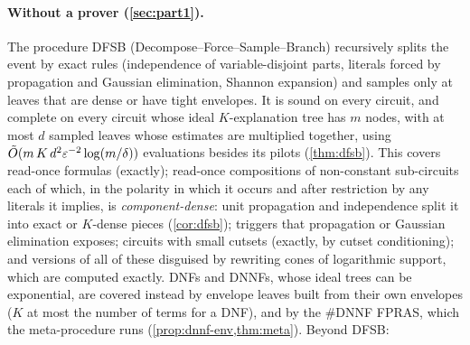\paragraph{Without a prover (\cref{sec:part1}).} The procedure DFSB
(Decompose--Force--Sample--Branch) recursively splits the event by exact rules
(independence of variable-disjoint parts, literals forced by propagation and Gaussian
elimination, Shannon expansion) and samples only at leaves that are dense or have tight
envelopes. It is sound on every circuit, and complete on every circuit whose ideal
$K$-explanation tree has $m$ nodes, with at most $d$ sampled leaves whose estimates are
multiplied together, using $\tilde O(m\,K\,d^2\varepsilon^{-2}\log(m/\delta))$ evaluations
besides its pilots (\cref{thm:dfsb}). This covers
read-once formulas (exactly); read-once compositions of non-constant sub-circuits each of
which, in the polarity in which it occurs and after restriction by any literals it implies,
is \emph{component-dense}: unit propagation and independence split it into exact or
$K$-dense pieces (\cref{cor:dfsb}); triggers that propagation or Gaussian elimination
exposes;
circuits with small cutsets (exactly, by cutset conditioning); and versions of all of
these disguised by rewriting cones of logarithmic support, which are computed exactly.
DNFs and DNNFs, whose ideal trees can be exponential, are covered instead by envelope
leaves built from their own envelopes ($K$ at most the number of terms for a DNF), and
by the \#DNNF FPRAS, which the meta-procedure runs (\cref{prop:dnnf-env,thm:meta}).
Beyond DFSB:
